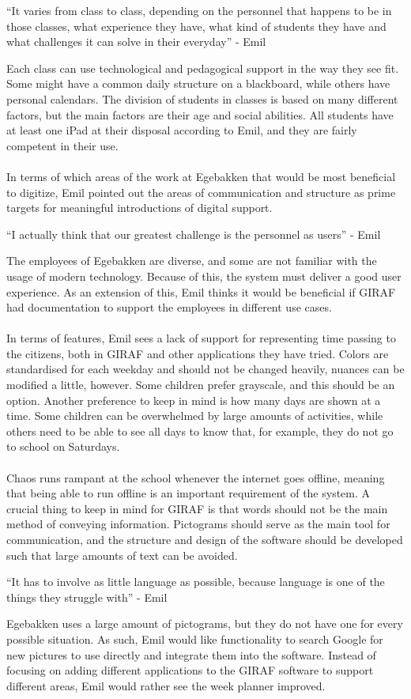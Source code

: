 \begin{displayquote}
    ``It varies from class to class, depending on the personnel that happens to be in those classes, what experience they have, what kind of students they have and what challenges it can solve in their everyday'' - Emil
\end{displayquote}
Each class can use technological and pedagogical support in the way they see fit.
Some might have a common daily structure on a blackboard, while others have personal calendars.
The division of students in classes is based on many different factors, but the main factors are their age and social abilities.
All students have at least one iPad at their disposal according to Emil, and they are fairly competent in their use.
\\\\
In terms of which areas of the work at Egebakken that would be most beneficial to digitize, Emil pointed out the areas of communication and structure as prime targets for meaningful introductions of digital support.
\begin{displayquote}
    ``I actually think that our greatest challenge is the personnel as users''  - Emil
\end{displayquote}
The employees of Egebakken are diverse, and some are not familiar with the usage of modern technology.
Because of this, the system must deliver a good user experience.
As an extension of this, Emil thinks it would be beneficial if GIRAF had documentation to support the employees in different use cases.
\\\\
In terms of features, Emil sees a lack of support for representing time passing to the citizens, both in GIRAF and other applications they have tried.
Colors are standardised for each weekday and should not be changed heavily, nuances can be modified a little, however.
Some children prefer grayscale, and this should be an option.
Another preference to keep in mind is how many days are shown at a time.
Some children can be overwhelmed by large amounts of activities, while others need to be able to see all days to know that, for example, they do not go to school on Saturdays.
\\\\
Chaos runs rampant at the school whenever the internet goes offline, meaning that being able to run offline is an important requirement of the system.
A crucial thing to keep in mind for GIRAF is that words should not be the main method of conveying information.
Pictograms should serve as the main tool for communication, and the structure and design of the software should be developed such that large amounts of text can be avoided.
\begin{displayquote}
    ``It has to involve as little language as possible, because language is one of the things they struggle with'' - Emil
\end{displayquote}
Egebakken uses a large amount of pictograms, but they do not have one for every possible situation.
As such, Emil would like functionality to search Google for new pictures to use directly and integrate them into the software.
Instead of focusing on adding different applications to the GIRAF software to support different areas, Emil would rather see the week planner improved.
